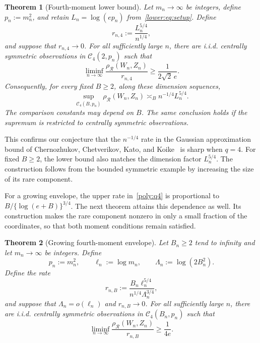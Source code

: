 \documentclass[11pt,letterpaper]{article}
\newtheorem{theorem}{Theorem}
\theoremstyle{remark}
\newcommand{\rh}{\rho_{\mathcal R}}
\begin{document}
\begin{theorem}[Fourth-moment lower bound]\label{opt:q4-lower}
Let \(m_n\to\infty\) be integers, {define} \(p_n:=m_n^2\), and
retain \(L_n=\log(ep_n)\) from~\eqref{lower:eq:setup}. Define
\[
 r_{n,4}:=\frac{L_n^{5/4}}{n^{1/4}},
\]
and suppose that \(r_{n,4}\to0\).
For all sufficiently large \(n\), there are i.i.d. centrally
symmetric observations in \(\mathcal C_4(2,p_n)\) such that
\begin{equation}
 \liminf_{n\to\infty}
 \frac{\rh(W_n,Z_n)}{r_{n,4}}\ge\frac1{2\sqrt2\,e}.
 \label{opt:eq:q4-lower}
\end{equation}
Consequently, for every fixed \(B\ge2\), along these dimension sequences,
\begin{equation}
 \sup_{\mathcal C_4(B,p_n)}\rh(W_n,Z_n)
 \asymp_B n^{-1/4}L_n^{5/4}.
 \label{lower:q4-fixed}
\end{equation}
The comparison constants may depend on \(B\). The same conclusion holds
if the supremum is restricted to centrally symmetric observations.
\end{theorem}

This confirms our conjecture that the \(n^{-1/4}\) rate in the Gaussian
approximation bound of Chernozhukov, Chetverikov, Kato, and
Koike~\cite[Theorem~2.5]{CCKK2022} is sharp when \(q=4\).
For fixed \(B\ge2\), the lower bound also matches the dimension factor
\(L_n^{5/4}\). The construction follows from the bounded symmetric
example by increasing the size of its rare component.

For a growing envelope, the upper rate in~\eqref{poly:q4} is
proportional to \(B/\{\log(e+B)\}^{3/4}\).
The next theorem attains this dependence as well. Its construction
makes the rare component nonzero in only a small fraction of the
coordinates, so that both moment conditions remain satisfied.

\begin{theorem}[Growing fourth-moment envelope]\label{opt:q4-growing}
Let \(B_n\ge2\) tend to infinity and let \(m_n\to\infty\) be integers.
{Define}
\[
 p_n:=m_n^2,\qquad \ell_n:=\log m_n,\qquad
 \Lambda_n:=\log(2B_n^2).
\]
Define the rate
\[
 r_{n,B}:=\frac{B_n\ell_n^{5/4}}{n^{1/4}\Lambda_n^{3/4}},
\]
and suppose that \(\Lambda_n=o(\ell_n)\) and \(r_{n,B}\to0\).
For all sufficiently large \(n\), there are i.i.d. centrally
symmetric observations in \(\mathcal C_4(B_n,p_n)\) such that
\begin{equation}
 \liminf_{n\to\infty}
 \frac{\rh(W_n,Z_n)}{r_{n,B}}\ge\frac1{4e}.
 \label{opt:eq:q4-growing}
\end{equation}
\end{theorem}
\end{document}
